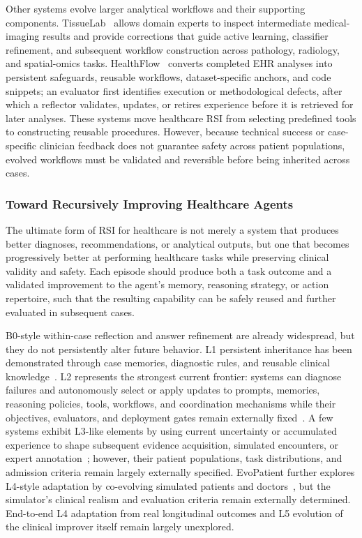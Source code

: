 Other systems evolve larger analytical workflows and their supporting components. TissueLab~\cite{li2025tissuelab} allows domain experts to inspect intermediate medical-imaging results and provide corrections that guide active learning, classifier refinement, and subsequent workflow construction across pathology, radiology, and spatial-omics tasks. HealthFlow~\cite{zhu2026healthflow} converts completed EHR analyses into persistent safeguards, reusable workflows, dataset-specific anchors, and code snippets; an evaluator first identifies execution or methodological defects, after which a reflector validates, updates, or retires experience before it is retrieved for later analyses. 
These systems move healthcare RSI from selecting predefined tools to constructing reusable procedures. However, because technical success or case-specific clinician feedback does not guarantee safety across patient populations, evolved workflows must be validated and reversible before being inherited across cases.


\vspace{-1em}
\subsubsection{Toward Recursively Improving Healthcare Agents}

The ultimate form of RSI for healthcare is not merely a system that produces better diagnoses, recommendations, or analytical outputs, but one that becomes progressively better at performing healthcare tasks while preserving clinical validity and safety. Each episode should produce both a task outcome and a validated improvement to the agent's memory, reasoning strategy, or action repertoire, such that the resulting capability can be safely reused and further evaluated in subsequent cases. 

B0-style within-case reflection and answer refinement are already widespread, but they do not persistently alter future behavior. L1 persistent inheritance has been demonstrated through case memories, diagnostic rules, and reusable clinical knowledge~\cite{lan2024agentmentalclinic,almansoori2025medagentsim,ren2026dxevolve}. L2 represents the strongest current frontier: systems can diagnose failures and autonomously select or apply updates to prompts, memories, reasoning policies, tools, workflows, and coordination mechanisms while their objectives, evaluators, and deployment gates remain externally fixed~\cite{he2026evoclinician,han2026gsem,shen2026evomedagent,liu2026evomdt,fan2026macro,sun2026skemex,zhu2026healthflow}. A few systems exhibit L3-like elements by using current uncertainty or accumulated experience to shape subsequent evidence acquisition, simulated encounters, or expert annotation~\cite{li2024agenthospital,li2025tissuelab}; however, their patient populations, task distributions, and admission criteria remain largely externally specified. EvoPatient further explores L4-style adaptation by co-evolving simulated patients and doctors~\cite{du2024evopatient}, but the simulator's clinical realism and evaluation criteria remain externally determined. End-to-end L4 adaptation from real longitudinal outcomes and L5 evolution of the clinical improver itself remain largely unexplored.

